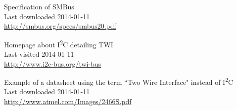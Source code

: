 \documentclass[journal]{IEEEtran}
\newcommand{\twi}{I\textsuperscript{2}C\xspace}
\begin{document}
\begin{thebibliography}{1}
		Specification of SMBus\\
		Last downloaded 2014-01-11\\
		\url{http://smbus.org/specs/smbus20.pdf}
		\medskip

		Homepage about \twi detailing TWI\\
		Last visited 2014-01-11\\
		\url{http://www.i2c-bus.org/twi-bus}
		\medskip

		Example of a datasheet using the term ``Two Wire Interface" instead of \twi\\
		Last downloaded 2014-01-11\\
		\url{http://www.atmel.com/Images/2466S.pdf}

\end{thebibliography}
\enlargethispage{-5in}
\end{document}
